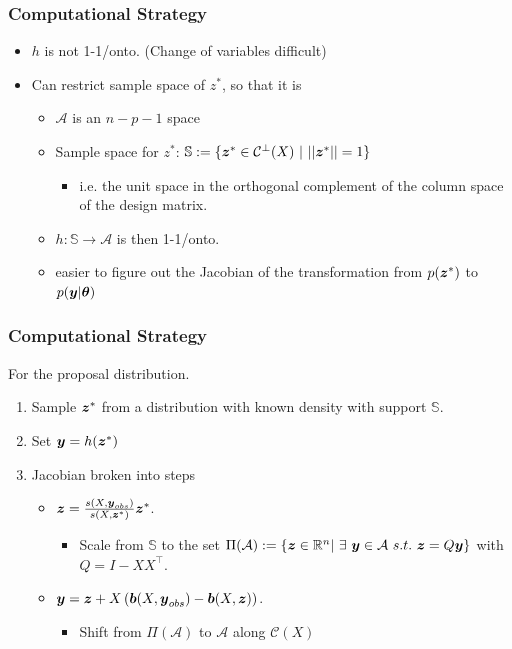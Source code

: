 \documentclass{beamer}
\def\bth{\mbox{\boldmath $\theta$}}
\newcommand{\by}{\mbox{\boldmath $y$}}
\newcommand{\bz}{\mbox{\boldmath $z$}}
\newcommand{\bb}{\mbox{\boldmath $b$}}
\begin{document}
\begin{frame}
	\frametitle{Computational Strategy}
	\begin{itemize}
	\item $h$ is not 1-1/onto. (Change of variables difficult)
	\item Can restrict sample space of $z^{*}$, so that it is
	\begin{itemize}
		\item $\mathcal{A}$ is an $n - p - 1$ space
		\item Sample space for $z^{*}$:  $\mathbb{S} := \{\bz^* \in \mathcal{C}^{\perp}(X)\  |\  ||\bz^*|| = 1\}$
		\begin{itemize}
			\item i.e. the unit space in the orthogonal complement of the column space of the design matrix.
		\end{itemize}
	\item $h: \mathbb{S} \rightarrow \mathcal{A}$ is then 1-1/onto.
	\item easier to figure out the Jacobian of the transformation from  $p(\bz^*)$ to $p(\by|\bth)$
	\end{itemize}
	
	\end{itemize}	
\end{frame}

\begin{frame}
	\frametitle{Computational Strategy}
	For the proposal distribution. 
	\begin{enumerate}
		\item Sample $\bz^*$ from a distribution with known density with support $\mathbb{S}$.
		\item Set $\by = h(\bz^*)$
		\item Jacobian broken into steps
	\begin{itemize}
		\item $\bz=\frac{s(X,\boldsymbol{y}_{obs})}{s(X, \boldsymbol{z}^{*})}\bz^{*}$. 
		\begin{itemize}
			\item Scale from $\mathbb{S}$ to the set $\Pi(\mathcal{A}):= \{\bz\in \mathbb{R}^n |\ \exists\ \by\in \mathcal{A}\ s.t.\ \bz=Q \by \}$ with $Q = I - XX^{\top}$.
	\end{itemize}
		\item $\by=\bz+X\left(\bb(X, \by_{obs})-\bb(X, \bz)\right)$. 
	\begin{itemize}
		\item Shift from $\Pi(\mathcal{A})$ to $\mathcal{A}$ along $\mathcal{C}(X)$
	\end{itemize}
	\end{itemize}
	\end{enumerate}
\end{frame}
\end{document}
